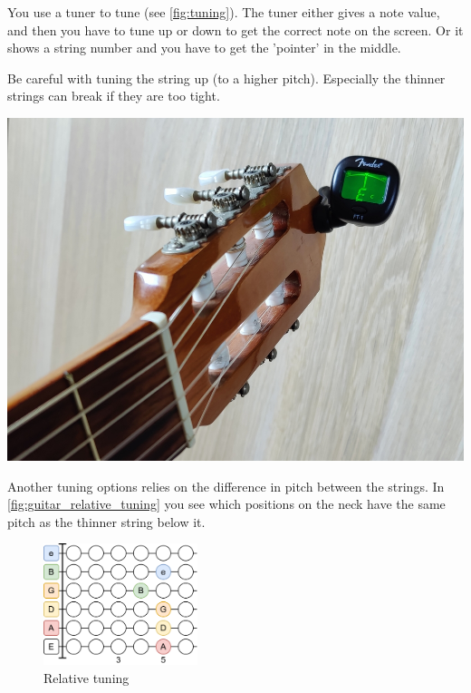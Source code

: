 \begin{minipage}{0.5\textwidth}
You use a tuner to tune (see \autoref{fig:tuning}). The tuner either gives a note value, and then you have to tune up or down to get the correct note on the screen. Or it shows a string number and you have to get the 'pointer' in the middle.

Be careful with tuning the string up (to a higher pitch). Especially the thinner strings can break if they are too tight.
\end{minipage}
\hfill
\begin{minipage}{0.3\textwidth}
    \centering
    \includegraphics[width=\textwidth]{../../Images/guitar-tuning.jpg}
    \label{fig:tuning}
\end{minipage}

Another tuning options relies on the difference in pitch between the strings. In \autoref{fig:guitar_relative_tuning} you see which positions on the neck have the same pitch as the thinner string below it.

\begin{figure}[h]
    \centering
    \includegraphics[width=0.4\textwidth]{../../Images/GuitarRelativeTuning.png}
    \caption{Relative tuning}
    \label{fig:guitar_relative_tuning}
\end{figure}
